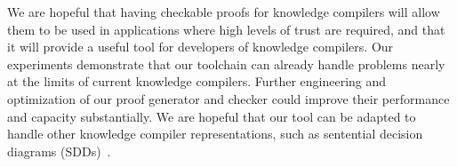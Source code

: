 \documentclass[letterpaper,USenglish,cleveref, autoref, thm-restate]{lipics-v2021}
\newcommand{\pand}{\mathbin{\land^\textsf{p}}}
\newcommand{\dependencyset}{{\cal D}}
\newcommand{\modelset}{{\cal M}}
\newcommand{\makenode}[1]{\mathbf{#1}}
\newcommand{\nodeu}{\makenode{u}}
\begin{document}
We are hopeful that having checkable proofs for knowledge compilers
will allow them to be used in applications where high levels of trust
are required, and that it will provide a useful tool for developers of
knowledge compilers.
Our experiments demonstrate that our toolchain can already handle
problems nearly at the limits of current knowledge compilers.  Further
engineering and optimization of our proof generator and checker could
improve their performance and capacity substantially.  We are hopeful
that our tool can be adapted to handle other knowledge compiler
representations, such as sentential decision diagrams (SDDs)~\cite{darwiche:ijcai:2011}.





\end{document}
